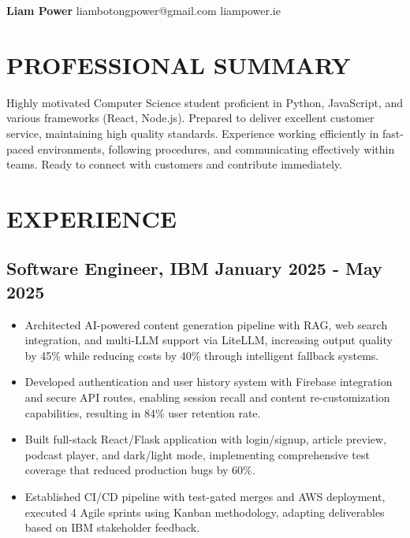 \documentclass[10pt,a4paper]{article}
\begin{document}
\begin{center}
{\large\bfseries Liam Power} \hfill {\large liambotongpower@gmail.com} \hfill {\large liampower.ie}
\end{center}

\section{PROFESSIONAL SUMMARY} 


Highly motivated Computer Science student proficient in Python, JavaScript, and various frameworks (React, Node.js). Prepared to deliver excellent customer service, maintaining high quality standards. Experience working efficiently in fast-paced environments, following procedures, and communicating effectively within teams. Ready to connect with customers and contribute immediately.


\section{EXPERIENCE}

\subsection{Software Engineer, IBM \hfill January 2025 - May 2025}
\begin{itemize}
\item Architected AI-powered content generation pipeline with RAG, web search integration, and multi-LLM support via LiteLLM, increasing output quality by 45\% while reducing costs by 40\% through intelligent fallback systems.
\item Developed authentication and user history system with Firebase integration and secure API routes, enabling session recall and content re-customization capabilities, resulting in 84\% user retention rate.
\item Built full-stack React/Flask application with login/signup, article preview, podcast player, and dark/light mode, implementing comprehensive test coverage that reduced production bugs by 60\%.
\item Established CI/CD pipeline with test-gated merges and AWS deployment, executed 4 Agile sprints using Kanban methodology, adapting deliverables based on IBM stakeholder feedback.
\end{itemize}
\end{document}
